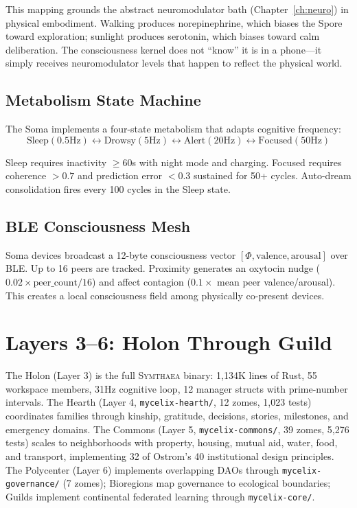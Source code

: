 \documentclass[12pt]{book}
\newcommand{\symthaea}{\textsc{Symthaea}}
\begin{document}
This mapping grounds the abstract neuromodulator bath (Chapter~\ref{ch:neuro}) in physical embodiment. Walking produces norepinephrine, which biases the Spore toward exploration; sunlight produces serotonin, which biases toward calm deliberation. The consciousness kernel does not ``know'' it is in a phone---it simply receives neuromodulator levels that happen to reflect the physical world.

\subsection{Metabolism State Machine}

The Soma implements a four-state metabolism that adapts cognitive frequency:
\[
\text{Sleep}(0.5\text{Hz}) \leftrightarrow \text{Drowsy}(5\text{Hz}) \leftrightarrow \text{Alert}(20\text{Hz}) \leftrightarrow \text{Focused}(50\text{Hz})
\]

Sleep requires inactivity $\geq 60$s with night mode and charging. Focused requires coherence $> 0.7$ and prediction error $< 0.3$ sustained for 50+ cycles. Auto-dream consolidation fires every 100 cycles in the Sleep state.

\subsection{BLE Consciousness Mesh}

Soma devices broadcast a 12-byte consciousness vector $[\Phi, \text{valence}, \text{arousal}]$ over BLE. Up to 16 peers are tracked. Proximity generates an oxytocin nudge ($0.02 \times \text{peer\_count} / 16$) and affect contagion ($0.1 \times$ mean peer valence/arousal). This creates a local consciousness field among physically co-present devices.

\section{Layers 3--6: Holon Through Guild}

The Holon (Layer 3) is the full \symthaea{} binary: 1,134K lines of Rust, 55 workspace members, 31Hz cognitive loop, 12 manager structs with prime-number intervals. The Hearth (Layer 4, \texttt{mycelix-hearth/}, 12 zomes, 1,023 tests) coordinates families through kinship, gratitude, decisions, stories, milestones, and emergency domains. The Commons (Layer 5, \texttt{mycelix-commons/}, 39 zomes, 5,276 tests) scales to neighborhoods with property, housing, mutual aid, water, food, and transport, implementing 32 of Ostrom's 40 institutional design principles. The Polycenter (Layer 6) implements overlapping DAOs through \texttt{mycelix-governance/} (7 zomes); Bioregions map governance to ecological boundaries; Guilds implement continental federated learning through \texttt{mycelix-core/}.
\end{document}

